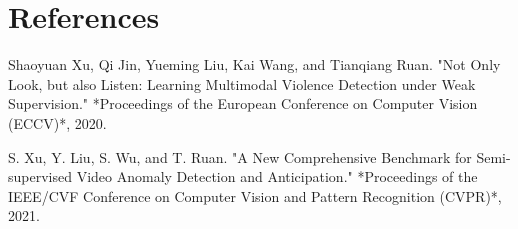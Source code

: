 \documentclass[twocolumn]{article}
\begin{document}
	
	\section{References} 
	\begin{thebibliography}{9}
		Shaoyuan Xu, Qi Jin, Yueming Liu, Kai Wang, and Tianqiang Ruan. "Not Only Look, but also Listen: Learning Multimodal Violence Detection under Weak Supervision." *Proceedings of the European Conference on Computer Vision (ECCV)*, 2020.

		S. Xu, Y. Liu, S. Wu, and T. Ruan. "A New Comprehensive Benchmark for Semi-supervised Video Anomaly Detection and Anticipation." *Proceedings of the IEEE/CVF Conference on Computer Vision and Pattern Recognition (CVPR)*, 2021.


		\end{thebibliography}
\end{document}
